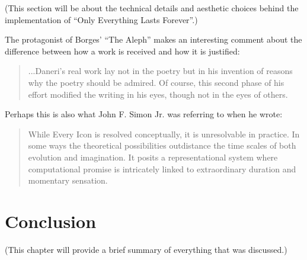 \documentclass{thesis}
\begin{document}
	(This section will be about the technical details and aesthetic choices behind the implementation of ``Only Everything Lasts Forever''.)

	The protagonist of Borges' ``The Aleph'' makes an interesting comment about the difference between how a work is received and how it is justified:
	
	\begin{quote}
	...Daneri's real work lay not in the poetry but in his invention of reasons why the poetry should be admired. Of course, this second phase of his effort modified the writing in his eyes, though not in the eyes of others.
	\end{quote}
	
	Perhaps this is also what John F. Simon Jr. was referring to when he wrote:
	
	\begin{quote}
	While Every Icon is resolved conceptually, it is unresolvable in practice. In some ways the theoretical possibilities outdistance the time scales of both evolution and imagination. It posits a representational system where computational promise is intricately linked to extraordinary duration and momentary sensation.\cite{john_f._simon_jr._given:32_1997}
	\end{quote}
	
\chapter{Conclusion}
	(This chapter will provide a brief summary of everything that was discussed.)

\begin{singlespace}


\end{singlespace}
\end{document}
